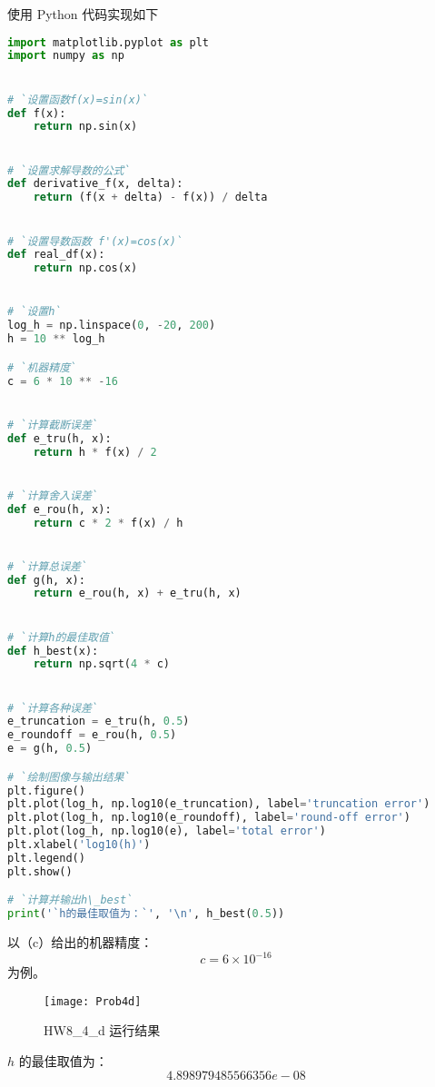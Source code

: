 \documentclass[UTF8]{ctexart}
\begin{document}
    使用 Python 代码实现如下
    \begin{lstlisting}[language=Python, breaklines = true,label={lst:lstlisting4.4}]
import matplotlib.pyplot as plt
import numpy as np


# `设置函数f(x)=sin(x)`
def f(x):
    return np.sin(x)


# `设置求解导数的公式`
def derivative_f(x, delta):
    return (f(x + delta) - f(x)) / delta


# `设置导数函数 f'(x)=cos(x)`
def real_df(x):
    return np.cos(x)


# `设置h`
log_h = np.linspace(0, -20, 200)
h = 10 ** log_h

# `机器精度`
c = 6 * 10 ** -16


# `计算截断误差`
def e_tru(h, x):
    return h * f(x) / 2


# `计算舍入误差`
def e_rou(h, x):
    return c * 2 * f(x) / h


# `计算总误差`
def g(h, x):
    return e_rou(h, x) + e_tru(h, x)


# `计算h的最佳取值`
def h_best(x):
    return np.sqrt(4 * c)


# `计算各种误差`
e_truncation = e_tru(h, 0.5)
e_roundoff = e_rou(h, 0.5)
e = g(h, 0.5)

# `绘制图像与输出结果`
plt.figure()
plt.plot(log_h, np.log10(e_truncation), label='truncation error')
plt.plot(log_h, np.log10(e_roundoff), label='round-off error')
plt.plot(log_h, np.log10(e), label='total error')
plt.xlabel('log10(h)')
plt.legend()
plt.show()

# `计算并输出h\_best`
print('`h的最佳取值为：`', '\n', h_best(0.5))
    \end{lstlisting}

    以（c）给出的机器精度：
    \begin{equation*}
        c = 6 \times 10^{-16}
    \end{equation*}
    为例。
    \begin{figure}[h]
        \centering
        \texttt{[image: Prob4d]}
        \caption{HW8\_4\_d 运行结果}\label{fig:figure4.4}
    \end{figure}

    \newpage
    \(h\) 的最佳取值为：
    \begin{equation*}
        4.898979485566356e-08
    \end{equation*}
\end{document}
